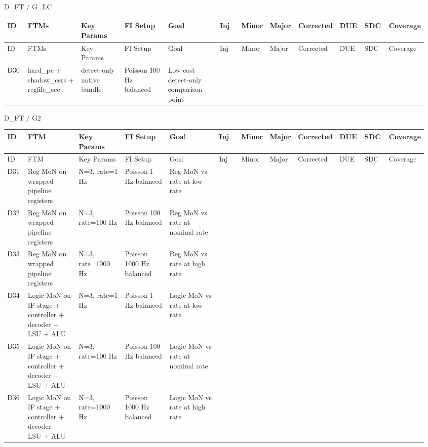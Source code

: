 D\_FT / G\_LC

\begin{longtable}{|p{0.05\linewidth}|p{0.14\linewidth}|p{0.12\linewidth}|p{0.12\linewidth}|p{0.14\linewidth}|p{0.06\linewidth}|p{0.06\linewidth}|p{0.06\linewidth}|p{0.06\linewidth}|p{0.06\linewidth}|p{0.06\linewidth}|p{0.06\linewidth}|}
\hline
ID & FTMs & Key Params & FI Setup & Goal & Inj & Minor & Major & Corrected & DUE & SDC & Coverage \\
\hline
\endfirsthead
\hline
ID & FTMs & Key Params & FI Setup & Goal & Inj & Minor & Major & Corrected & DUE & SDC & Coverage \\
\hline
\endhead
D30 & hard\_pc + shadow\_csrs + regfile\_ecc & detect-only native bundle & Poisson 100 Hz \textbar{} balanced & Low-cost detect-only comparison point &  &  &  &  &  &  &  \\
\hline
\end{longtable}

D\_FT / G2

\begin{longtable}{|p{0.05\linewidth}|p{0.14\linewidth}|p{0.12\linewidth}|p{0.12\linewidth}|p{0.14\linewidth}|p{0.06\linewidth}|p{0.06\linewidth}|p{0.06\linewidth}|p{0.06\linewidth}|p{0.06\linewidth}|p{0.06\linewidth}|p{0.06\linewidth}|}
\hline
ID & FTM & Key Params & FI Setup & Goal & Inj & Minor & Major & Corrected & DUE & SDC & Coverage \\
\hline
\endfirsthead
\hline
ID & FTM & Key Params & FI Setup & Goal & Inj & Minor & Major & Corrected & DUE & SDC & Coverage \\
\hline
\endhead
D31 & Reg MoN on wrapped pipeline registers & N=3, rate=1 Hz & Poisson 1 Hz \textbar{} balanced & Reg MoN vs rate at low rate &  &  &  &  &  &  &  \\
\hline
D32 & Reg MoN on wrapped pipeline registers & N=3, rate=100 Hz & Poisson 100 Hz \textbar{} balanced & Reg MoN vs rate at nominal rate &  &  &  &  &  &  &  \\
\hline
D33 & Reg MoN on wrapped pipeline registers & N=3, rate=1000 Hz & Poisson 1000 Hz \textbar{} balanced & Reg MoN vs rate at high rate &  &  &  &  &  &  &  \\
\hline
D34 & Logic MoN on IF stage + controller + decoder + LSU + ALU & N=3, rate=1 Hz & Poisson 1 Hz \textbar{} balanced & Logic MoN vs rate at low rate &  &  &  &  &  &  &  \\
\hline
D35 & Logic MoN on IF stage + controller + decoder + LSU + ALU & N=3, rate=100 Hz & Poisson 100 Hz \textbar{} balanced & Logic MoN vs rate at nominal rate &  &  &  &  &  &  &  \\
\hline
D36 & Logic MoN on IF stage + controller + decoder + LSU + ALU & N=3, rate=1000 Hz & Poisson 1000 Hz \textbar{} balanced & Logic MoN vs rate at high rate &  &  &  &  &  &  &  \\
\hline
\end{longtable}

